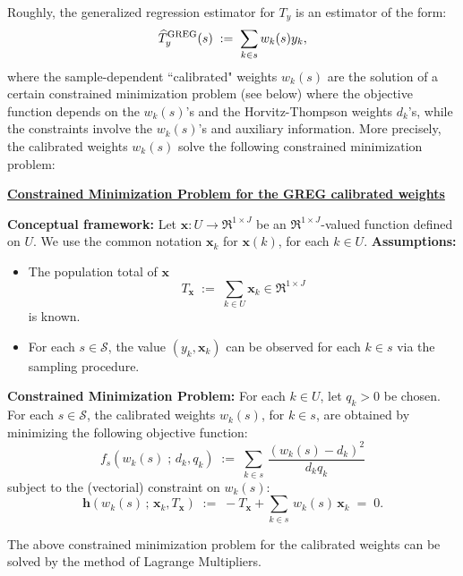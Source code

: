 \documentclass{article}
\begin{document}
Roughly, the generalized regression estimator for $T_{y}$ is an estimator of the form:
\begin{equation*}
\widehat{T}^{\textnormal{GREG}}_{y}(s)
\; := \;
\sum_{k \in s} w_{k}(s) y_{k},
\end{equation*}
where the sample-dependent ``calibrated" weights $w_{k}(s)$ are the solution of a
certain constrained minimization problem (see below) where the objective function
depends on the $w_{k}(s)$'s and the Horvitz-Thompson weights $d_{k}$'s, while
the constraints involve the $w_{k}(s)$'s and auxiliary information.
More precisely, the calibrated weights $w_{k}(s)$ solve the following constrained
minimization problem:

\vskip 0.5cm
\begin{center}
\begin{minipage}{6.0in}
\begin{center}
\textbf{\large\underline{Constrained Minimization Problem for the GREG calibrated weights}}
\end{center}
\noindent
\textbf{Conceptual framework:}\;\;
Let $\mathbf{x} : U \longrightarrow \Re^{1 \times J}$ be an $\Re^{1 \times J}$-valued
function defined on $U$.
We use the common notation $\mathbf{x}_{k}$ for $\mathbf{x}(k)$, for each $k \in U$.
\vskip 0.3cm
\noindent
\textbf{Assumptions:}
\begin{itemize}
\item	The population total of $\mathbf{x}$
		\begin{equation*} T_{\mathbf{x}} \; := \; \sum_{k \in U} \mathbf{x}_{k} \in \Re^{1\times J} \end{equation*}
		is known.
\item	For each $s \in \mathcal{S}$, the value $(y_{k},\mathbf{x}_{k})$ can be observed for each $k \in s$ via the sampling procedure.
\end{itemize}
\vskip 0.3cm
\noindent
\textbf{Constrained Minimization Problem:}\;\;
For each $k \in U$, let $q_{k} > 0$ be chosen.
For each $s \in \mathcal{S}$, the calibrated weights $w_{k}(s)$, for $k \in s$, are obtained
by minimizing the following objective function:
\begin{equation*}
f_{s}(w_{k}(s)\;;\,d_{k},q_{k})
\;:=\;\sum_{k \in s}\,\dfrac{(w_{k}(s) - d_{k})^{2}}{d_{k}q_{k}}
\end{equation*}
subject to the (vectorial) constraint on $w_{k}(s)$:
\begin{equation*}
\mathbf{h}(w_{k}(s)\,;\,\mathbf{x}_{k},T_{\mathbf{x}})
\;:=\; - T_{\mathbf{x}} + \sum_{k \in s}\, w_{k}(s)\,\mathbf{x}_{k} \; = \; 0.
\end{equation*}
\end{minipage}
\end{center}
\vskip 1.0cm
The above constrained minimization problem for the calibrated weights can be solved
by the method of Lagrange Multipliers.
\end{document}
